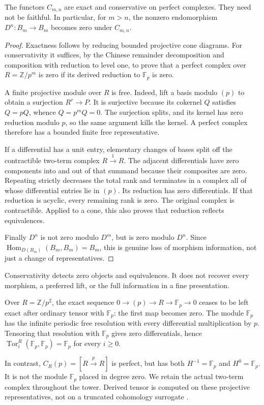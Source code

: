 \begin{theorem}\label{thm:adic-tower}
The functors $C_{m,n}$ are exact and conservative on perfect complexes. They need not be faithful. In particular, for $m>n$, the nonzero endomorphism $D^n:B_m\to B_m$ becomes zero under $C_{m,n}$.
\end{theorem}
\begin{proof}
Exactness follows by reducing bounded projective cone diagrams. For conservativity it suffices, by the Chinese remainder decomposition and composition with reduction to level one, to prove that a perfect complex over $R=\mathbb Z/p^m$ is zero if its derived reduction to $\mathbb F_p$ is zero.

A finite projective module over $R$ is free. Indeed, lift a basis modulo $(p)$ to obtain a surjection $R^r\to P$. It is surjective because its cokernel $Q$ satisfies $Q=pQ$, whence $Q=p^mQ=0$. The surjection splits, and its kernel has zero reduction modulo $p$, so the same argument kills the kernel. A perfect complex therefore has a bounded finite free representative.

If a differential has a unit entry, elementary changes of bases split off the contractible two-term complex $R\xrightarrow{1}R$. The adjacent differentials have zero components into and out of that summand because their composites are zero. Repeating strictly decreases the total rank and terminates in a complex all of whose differential entries lie in $(p)$. Its reduction has zero differentials. If that reduction is acyclic, every remaining rank is zero. The original complex is contractible. Applied to a cone, this also proves that reduction reflects equivalences.

Finally $D^n$ is not zero modulo $D^m$, but is zero modulo $D^n$. Since $\operatorname{Hom}_{D(B_m)}(B_m,B_m)=B_m$, this is genuine loss of morphism information, not just a change of representatives.
\end{proof}

Conservativity detects zero objects and equivalences. It does not recover every morphism, a preferred lift, or the full information in a fine presentation.

\begin{example}\label{ex:derived-not-naive}
Over $R=\mathbb Z/p^2$, the exact sequence $0\to(p)\to R\to\mathbb F_p\to0$ ceases to be left exact after ordinary tensor with $\mathbb F_p$: the first map becomes zero. The module $\mathbb F_p$ has the infinite periodic free resolution with every differential multiplication by $p$. Tensoring that resolution with $\mathbb F_p$ gives zero differentials, hence $\operatorname{Tor}_i^R(\mathbb F_p,\mathbb F_p)=\mathbb F_p$ for every $i\geq0$.

In contrast, $C_R(p)=[R\xrightarrow p R]$ is perfect, but has both $H^{-1}=\mathbb F_p$ and $H^0=\mathbb F_p$. It is not the module $\mathbb F_p$ placed in degree zero. We retain the actual two-term complex throughout the tower. Derived tensor is computed on these projective representatives, not on a truncated cohomology surrogate \cite{StacksDerivedTensor}.
\end{example}

